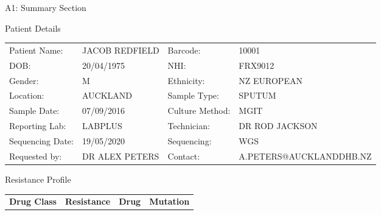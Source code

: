 \documentclass{article}
\begin{document}


\begin{reportSection}{A1: Summary Section}
\begin{reportBox}{Patient Details}


\noindent \begin{tabular}{|p{}p{}||p{}p{}|}
\hline
Patient Name: & JACOB REDFIELD & Barcode: & 10001 \\
DOB: & 20/04/1975 & NHI: & FRX9012 \\
Gender: & M & Ethnicity: & NZ EUROPEAN \\ \cline{1-4}
\hline
Location: & AUCKLAND & Sample Type: & SPUTUM \\
Sample Date: & 07/09/2016 & Culture Method: & MGIT \\
Reporting Lab: & LABPLUS & Technician: & DR ROD JACKSON \\
Sequencing Date: & 19/05/2020 & Sequencing: & WGS \\
\hline
Requested by: & DR ALEX PETERS & Contact: & A.PETERS@AUCKLANDDHB.NZ \\ \cline{1-4}
\end{tabular}
\end{reportBox}

\vspace{1cm}



\begin{reportBox}{Resistance Profile}
\noindent \begin{tabular}{|p{}|p{}|p{}|p{}|} \hline
\multicolumn{1}{|l|}{\textbf{Drug Class}} & \textbf{Resistance} & \textbf{Drug} & \textbf{Mutation} \\ \cline{1-4}


\end{tabular}
\end{reportBox}
\end{reportSection}
\end{document}
